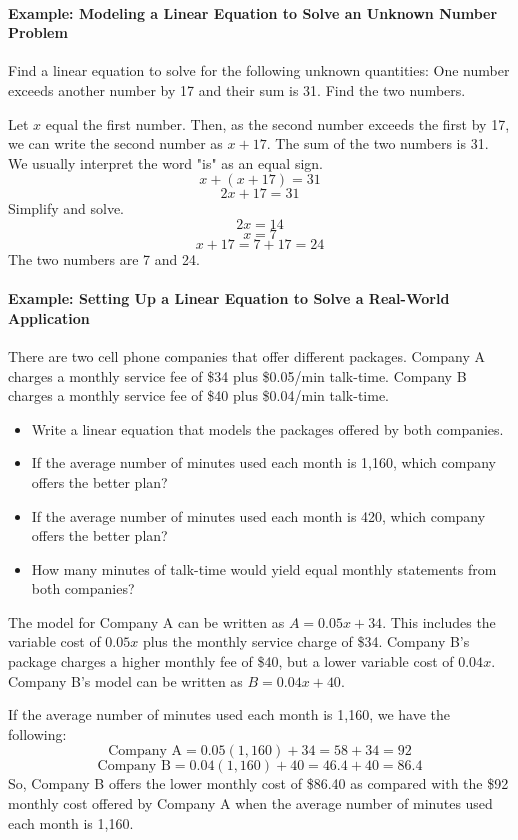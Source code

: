 \paragraph{Example: Modeling a Linear Equation to Solve an Unknown Number Problem}

Find a linear equation to solve for the following unknown quantities: One number exceeds another number by 17 and their sum is 31. Find the two numbers.

Let $x$ equal the first number. Then, as the second number exceeds the first by 17, we can write the second number as $x + 17$. The sum of the two numbers is 31. We usually interpret the word "is" as an equal sign.
$$
x + (x + 17) = 31
$$
$$
2x + 17 = 31
$$
Simplify and solve.
$$
2x = 14
$$
$$
x = 7
$$
$$
x + 17 = 7 + 17 = 24
$$
The two numbers are 7 and 24.

\paragraph{Example: Setting Up a Linear Equation to Solve a Real-World Application}

There are two cell phone companies that offer different packages. Company A charges a monthly service fee of \$34 plus \$0.05/min talk-time. Company B charges a monthly service fee of \$40 plus \$0.04/min talk-time.

\begin{itemize}
    \item Write a linear equation that models the packages offered by both companies.
    \item If the average number of minutes used each month is 1,160, which company offers the better plan?
    \item If the average number of minutes used each month is 420, which company offers the better plan?
    \item How many minutes of talk-time would yield equal monthly statements from both companies?
\end{itemize}

The model for Company A can be written as $A = 0.05x + 34$. This includes the variable cost of $0.05x$ plus the monthly service charge of \$34. Company B's package charges a higher monthly fee of \$40, but a lower variable cost of $0.04x$. Company B's model can be written as $B = 0.04x + 40$.

If the average number of minutes used each month is 1,160, we have the following:
$$
\text{Company A} = 0.05(1,160) + 34 = 58 + 34 = 92
$$
$$
\text{Company B} = 0.04(1,160) + 40 = 46.4 + 40 = 86.4
$$
So, Company B offers the lower monthly cost of \$86.40 as compared with the \$92 monthly cost offered by Company A when the average number of minutes used each month is 1,160.

